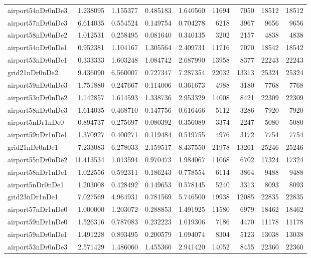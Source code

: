 \begin{longtable}{|l|r|r|r|r|r|r|r|r|}
airport54nDr0nDe3 & 1.238095 & 1.155377 & 0.485183 & 1.640560 & 11694 & 7050 & 18512 & 18512 \\
airport57nDr0nDe3 & 6.614035 & 0.554524 & 0.149754 & 0.704278 & 6218 & 3967 & 9656 & 9656 \\
airport58nDr0nDe2 & 1.012531 & 0.258495 & 0.081640 & 0.340135 & 3202 & 2157 & 4838 & 4838 \\
airport54nDr0nDe1 & 0.952381 & 1.104167 & 1.305564 & 2.409731 & 11716 & 7070 & 18542 & 18542 \\
airport53nDr0nDe1 & 0.333333 & 1.603248 & 1.084742 & 2.687990 & 13958 & 8377 & 22243 & 22243 \\
grid21nDr0nDe2 & 9.436090 & 6.560007 & 0.727347 & 7.287354 & 22032 & 13313 & 25324 & 25324 \\
airport59nDr0nDe3 & 1.751880 & 0.247667 & 0.114006 & 0.361673 & 4988 & 3180 & 7768 & 7768 \\
airport53nDr0nDe2 & 1.142857 & 1.614593 & 1.338736 & 2.953329 & 14008 & 8421 & 22309 & 22309 \\
airport58nDr0nDe3 & 1.614035 & 0.468710 & 0.147756 & 0.616466 & 5112 & 3286 & 7920 & 7920 \\
airport5nDr1nDe0 & 0.894737 & 0.275697 & 0.080392 & 0.356089 & 3374 & 2247 & 5080 & 5080 \\
airport59nDr1nDe1 & 1.370927 & 0.400271 & 0.119484 & 0.519755 & 4976 & 3172 & 7754 & 7754 \\
grid21nDr0nDe1 & 7.233083 & 6.278033 & 2.159517 & 8.437550 & 21978 & 13261 & 25246 & 25246 \\
airport55nDr0nDe2 & 11.413534 & 1.013594 & 0.970473 & 1.984067 & 11068 & 6702 & 17324 & 17324 \\
airport58nDr1nDe1 & 1.022556 & 0.592311 & 0.186243 & 0.778554 & 6114 & 3864 & 9488 & 9488 \\
airport5nDr0nDe1 & 1.203008 & 0.428492 & 0.149653 & 0.578145 & 5240 & 3313 & 8093 & 8093 \\
grid23nDr1nDe1 & 7.027569 & 4.964931 & 0.781569 & 5.746500 & 19938 & 12085 & 22835 & 22835 \\
airport57nDr1nDe0 & 1.000000 & 1.203072 & 0.288853 & 1.491925 & 11580 & 6979 & 18462 & 18462 \\
airport59nDr1nDe0 & 1.526316 & 0.787083 & 0.232223 & 1.019306 & 7186 & 4470 & 11178 & 11178 \\
airport59nDr0nDe1 & 1.491228 & 0.893495 & 0.200579 & 1.094074 & 8304 & 5123 & 13038 & 13038 \\
airport53nDr0nDe3 & 2.571429 & 1.486060 & 1.455360 & 2.941420 & 14052 & 8455 & 22360 & 22360 \\

\end{longtable}
